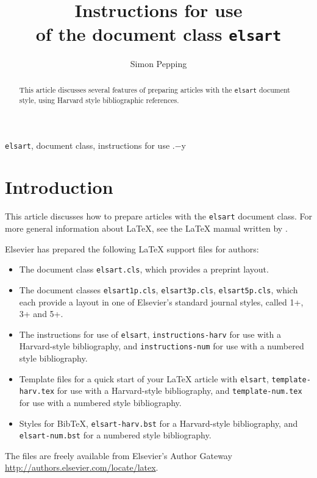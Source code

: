 \documentclass{elsart}
\def\file#1{\texttt{#1}}
\begin{document}
\begin{frontmatter}
\title{Instructions for use\\of the document class \file{elsart}}

\author{Simon Pepping}
\address{Elsevier, P.O. Box 103, 1000 AC Amsterdam,
Netherlands}


\begin{abstract}
This article discusses several features of preparing articles
with the \file{elsart} document style, using Harvard style bibliographic
references.
\end{abstract}

\begin{keyword}
\file{elsart}, document class, instructions for use
.$-$y
\end{keyword}
\end{frontmatter}

\section{Introduction}
\label{intro}

This article discusses how to prepare articles with the \file{elsart}
document class.  For more general information about \LaTeX{}, see the
\LaTeX{} manual written by \citet{Lamp86}.

Elsevier has prepared the following \LaTeX{} support files for
authors:
\begin{itemize}
\item The document class \file{elsart.cls}, which provides a preprint
  layout.
\item The document classes \file{elsart1p.cls}, \file{elsart3p.cls},
  \file{elsart5p.cls}, which each provide a layout in one of
  Elsevier's standard journal styles, called 1+, 3+ and 5+.
\item The instructions for use of \file{elsart},
  \file{instructions-harv} for use with a Harvard-style bibliography,
  and \file{instructions-num} for use with a numbered style
  bibliography.
\item Template files for a quick start of your \LaTeX{} article with
  \file{elsart},
  \newline
  \file{template-harv.tex} for use with a Harvard-style
  bibliography, and
  \newline
  \file{template-num.tex} for use with a numbered
  style bibliography.
\item Styles for BibTeX, \file{elsart-harv.bst} for a Harvard-style
  bibliography, and \file{elsart-num.bst} for a numbered style
  bibliography.
\end{itemize}
The files are freely available from Elsevier's Author Gateway
\url{http://authors.elsevier.com/locate/latex}. 
\end{document}
